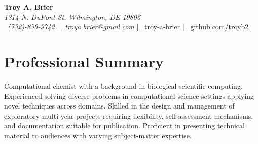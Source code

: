 \documentclass[letterpaper,10pt]{article}
\newcommand{\sectionspace}{
\vspace{-17pt}
}
\begin{document}
\begin{flushleft}
    \textbf{\LARGE Troy A. Brier} \\    
    \textcolor{color1}{\textit{1314 N. DuPont St. Wilmington, DE 19806}} \\
    \Mobilefone~\textcolor{color1}{\textit{(732)-859-9742}} {\large $|$}
    \href{mailto:troya.brier@gmail.com}{{\Letter~\textcolor{color1}{\textit{troya.brier@gmail.com}}}} {\large $|$}
    \href{https://www.linkedin.com/in/troy-a-brier/}{\faLinkedin~\textcolor{color1}{troy-a-brier}} {\large $|$}
    \href{https://github.com/troyb2}{\Keyboard~\textcolor{color1}{github.com/troyb2}} %
    \vspace{-8pt}
\end{flushleft}

\section{\textcolor{color1}{Professional Summary}}
\vspace{-3pt}
\begin{itemize}[leftmargin=0.15in, label={}]
    {\item{
        {Computational chemist with a background in biological scientific computing.
         Experienced solving diverse problems in computational science settings applying novel techniques across domains.
         Skilled in the design and management of exploratory multi-year projects requiring flexibility, self-assessment mechanisms, and documentation suitable for publication.
         Proficient in presenting technical material to audiences with varying subject-matter expertise.
        } \\
    }}
 \end{itemize}
 \sectionspace
\vspace{3pt}

\end{document}
